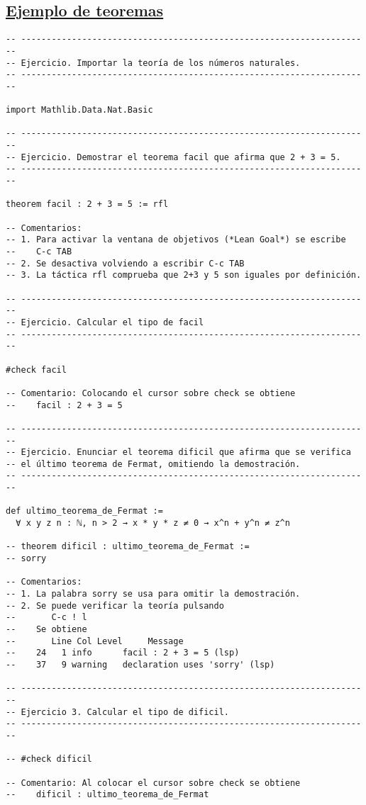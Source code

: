 \subsection{\href{./src/Introduccion/Ejemplo\_de\_teoremas.lean}{Ejemplo de teoremas}}
\label{sec:org1623638}
\begin{verbatim}
-- ---------------------------------------------------------------------
-- Ejercicio. Importar la teoría de los números naturales.
-- ---------------------------------------------------------------------

import Mathlib.Data.Nat.Basic

-- ---------------------------------------------------------------------
-- Ejercicio. Demostrar el teorema facil que afirma que 2 + 3 = 5.
-- ---------------------------------------------------------------------

theorem facil : 2 + 3 = 5 := rfl

-- Comentarios:
-- 1. Para activar la ventana de objetivos (*Lean Goal*) se escribe
--    C-c TAB
-- 2. Se desactiva volviendo a escribir C-c TAB
-- 3. La táctica rfl comprueba que 2+3 y 5 son iguales por definición.

-- ---------------------------------------------------------------------
-- Ejercicio. Calcular el tipo de facil
-- ---------------------------------------------------------------------

#check facil

-- Comentario: Colocando el cursor sobre check se obtiene
--    facil : 2 + 3 = 5

-- ---------------------------------------------------------------------
-- Ejercicio. Enunciar el teorema dificil que afirma que se verifica
-- el último teorema de Fermat, omitiendo la demostración.
-- ---------------------------------------------------------------------

def ultimo_teorema_de_Fermat :=
  ∀ x y z n : ℕ, n > 2 → x * y * z ≠ 0 → x^n + y^n ≠ z^n

-- theorem dificil : ultimo_teorema_de_Fermat :=
-- sorry

-- Comentarios:
-- 1. La palabra sorry se usa para omitir la demostración.
-- 2. Se puede verificar la teoría pulsando
--       C-c ! l
--    Se obtiene
--       Line Col Level     Message
--    24   1 info      facil : 2 + 3 = 5 (lsp)
--    37   9 warning   declaration uses 'sorry' (lsp)

-- ---------------------------------------------------------------------
-- Ejercicio 3. Calcular el tipo de dificil.
-- ---------------------------------------------------------------------

-- #check dificil

-- Comentario: Al colocar el cursor sobre check se obtiene
--    dificil : ultimo_teorema_de_Fermat
\end{verbatim}

